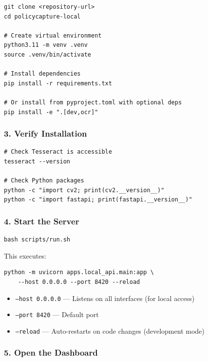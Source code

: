 \documentclass[12pt, a4paper]{article}
\newcommand{\codeinline}[1]{\texttt{\small\colorbox{codebg}{#1}}}
\begin{document}
\begin{lstlisting}[style=bash]
git clone <repository-url>
cd policycapture-local

# Create virtual environment
python3.11 -m venv .venv
source .venv/bin/activate

# Install dependencies
pip install -r requirements.txt

# Or install from pyproject.toml with optional deps
pip install -e ".[dev,ocr]"
\end{lstlisting}

\subsubsection{3. Verify Installation}

\begin{lstlisting}[style=bash]
# Check Tesseract is accessible
tesseract --version

# Check Python packages
python -c "import cv2; print(cv2.__version__)"
python -c "import fastapi; print(fastapi.__version__)"
\end{lstlisting}

\subsubsection{4. Start the Server}

\begin{lstlisting}[style=bash]
bash scripts/run.sh
\end{lstlisting}

This executes:
\begin{lstlisting}[style=bash]
python -m uvicorn apps.local_api.main:app \
    --host 0.0.0.0 --port 8420 --reload
\end{lstlisting}

\begin{itemize}
    \item \codeinline{--host 0.0.0.0} --- Listens on all interfaces (for local access)
    \item \codeinline{--port 8420} --- Default port
    \item \codeinline{--reload} --- Auto-restarts on code changes (development mode)
\end{itemize}

\subsubsection{5. Open the Dashboard}
\end{document}
